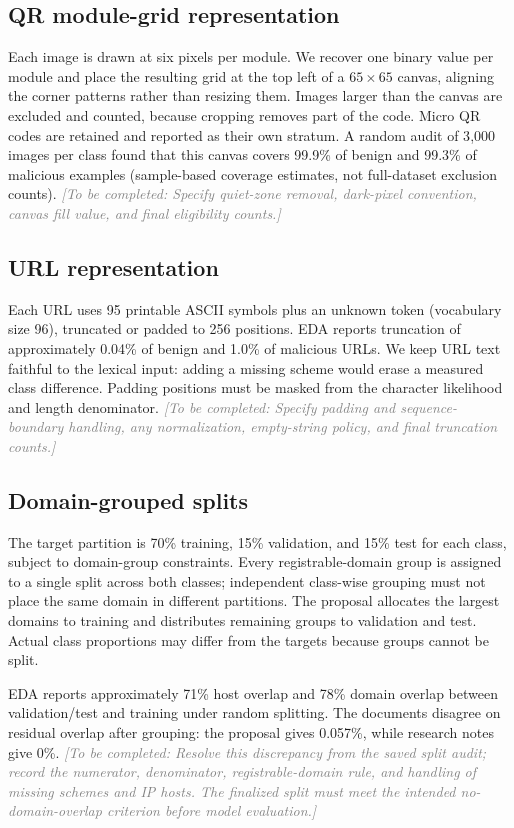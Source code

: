 \documentclass{article}
\newcommand{\pending}[1]{\textcolor{gray}{\textit{[To be completed: #1]}}}
\begin{document}
\subsection{QR module-grid representation}
Each image is drawn at six pixels per module.
We recover one binary value per module and place the resulting grid at the top left of a $65\times65$ canvas, aligning the corner patterns rather than resizing them.
Images larger than the canvas are excluded and counted, because cropping removes part of the code.
Micro QR codes are retained and reported as their own stratum.
A random audit of 3{,}000 images per class found that this canvas covers 99.9\% of benign and 99.3\% of malicious examples (sample-based coverage estimates, not full-dataset exclusion counts).
\pending{Specify quiet-zone removal, dark-pixel convention, canvas fill value, and final eligibility counts.}

\subsection{URL representation}
Each URL uses 95 printable ASCII symbols plus an unknown token (vocabulary size 96), truncated or padded to 256 positions.
EDA reports truncation of approximately 0.04\% of benign and 1.0\% of malicious URLs.
We keep URL text faithful to the lexical input: adding a missing scheme would erase a measured class difference.
Padding positions must be masked from the character likelihood and length denominator.
\pending{Specify padding and sequence-boundary handling, any normalization, empty-string policy, and final truncation counts.}

\subsection{Domain-grouped splits}
The target partition is 70\% training, 15\% validation, and 15\% test for each class, subject to domain-group constraints.
Every registrable-domain group is assigned to a single split across both classes; independent class-wise grouping must not place the same domain in different partitions.
The proposal allocates the largest domains to training and distributes remaining groups to validation and test.
Actual class proportions may differ from the targets because groups cannot be split.

EDA reports approximately 71\% host overlap and 78\% domain overlap between validation/test and training under random splitting.
The documents disagree on residual overlap after grouping: the proposal gives 0.057\%, while research notes give 0\%.
\pending{Resolve this discrepancy from the saved split audit; record the numerator, denominator, registrable-domain rule, and handling of missing schemes and IP hosts. The finalized split must meet the intended no-domain-overlap criterion before model evaluation.}
\end{document}

